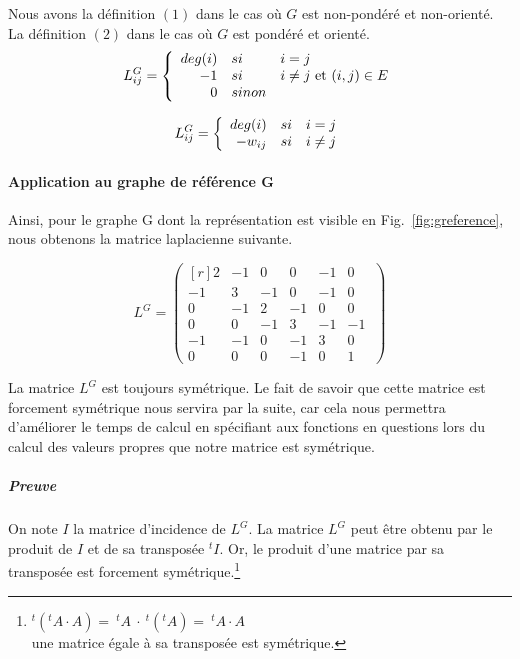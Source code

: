 \documentclass[a4paper, 11pt]{article}
\begin{document}
Nous avons la définition $(1)$ dans le cas où $G$ est non-pondéré et non-orienté. La définition $(2)$ dans le cas où $G$ est pondéré et orienté.\\

\begin{equation}
  L^G_{ij} =
  \left\{
  \begin{array}{r l l}
    deg(i) &si& i = j \\
    -1 &si& i \neq j \text{ et } (i,j) \in E \\
    0 &sinon&
  \end{array}
  \right.
\end{equation}

\begin{equation}
  L^G_{ij} =
  \left\{
  \begin{array}{r l l}
    deg(i) &si& i = j \\
    -w_{ij} &si& i \neq j\\
  \end{array}
  \right.
\end{equation}

\paragraph{Application au graphe de référence G}

Ainsi, pour le graphe G dont la représentation est visible en Fig.~\ref{fig:greference}, nous obtenons la matrice laplacienne suivante.

\[
L^G =
\begin{pmatrix*}[r]
  2 & -1 & 0 & 0 & -1 & 0\  \\
  -1 & 3 & -1 & 0 & -1 & 0\  \\
  0 & -1 & 2 & -1 & 0 & 0\  \\
  0 & 0 & -1 & 3 & -1 & -1\  \\
  -1 & -1 & 0 & -1 & 3 & 0\  \\
  0 & 0 & 0 & -1 & 0 & 1\
\end{pmatrix*}
\]

La matrice $L^G$ est toujours symétrique. Le fait de savoir que cette matrice est forcement symétrique nous servira par la suite, car cela nous permettra d'améliorer le temps de calcul en spécifiant aux fonctions en questions lors du calcul des valeurs propres que notre matrice est symétrique.

\subparagraph{Preuve}
On note $I$ la matrice d'incidence de $L^G$. La matrice $L^G$ peut être obtenu par le produit de $I$ et de sa transposée $^tI$.
Or, le produit d'une matrice par sa transposée est forcement symétrique.\footnote{$^t(^tA \cdot A) =\ ^tA\ \cdot \ ^t(^tA) =\ ^tA \cdot A$ \\ une matrice égale à sa transposée est symétrique.}
\end{document}
